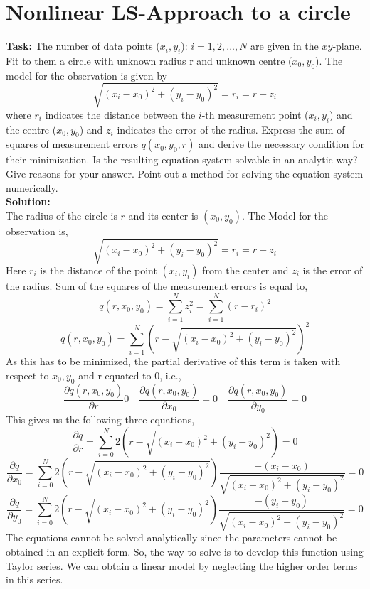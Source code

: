 \section{Nonlinear LS-Approach to a circle }
\noindent \textbf{Task:} The number of data points ($x_i,y_i$): $i = 1,2,...,N$ are given in the $xy$-plane. Fit to them a circle with unknown radius r and unknown centre ($x_0, y_0$). The model for the observation is given by
$$ \sqrt{(x_i - x_0)^2 + (y_i - y_0)^2} = r_i = r + z_i $$
\noindent where $r_i$ indicates the distance between the $i$-th measurement point ($x_i, y_i$) and the centre ($x_0, y_0$) and $z_i$ indicates the error of the radius. Express the sum of squares of measurement errors $q(x_0, y_0, r)$ and derive the necessary condition for their minimization. Is the resulting equation system solvable in an analytic way? Give reasons for your answer. Point out a method for solving the equation system numerically.
\\
\noindent \textbf{Solution:}\\
\noindent The radius of the circle is $r$ and its center is $(x_0,y_0)$. The Model for the observation is,
$$ \sqrt{(x_i - x_0)^2 + (y_i - y_0)^2} = r_i = r + z_i $$
\noindent Here $r_i$ is the distance of the point $(x_i,y_i)$ from the center and $z_i$ is the error of the radius. Sum of the squares of the measurement errors is equal to,
$$q(r,x_0,y_0) = \sum_{i=1}^Nz_i^2 = \sum_{i=1}^N(r-r_i)^2$$
$$q(r,x_0,y_0) = \sum_{i=1}^N(r-\sqrt{(x_i-x_0)^2+(y_i-y_0)^2})^2$$
\noindent As this has to be minimized, the partial derivative of this term is taken with respect to $x_0,y_0$ and r equated to 0, i.e.,
$$\frac{\partial q(r,x_0,y_0)}{\partial r} 0  \quad \frac{\partial q(r,x_0,y_0)}{\partial x_0} = 0 \quad \frac{\partial q(r,x_0,y_0)}{\partial y_0} = 0$$
\noindent This gives us the following three equations,
$$\frac{\partial q}{\partial r} = \sum_{i=0}^N2(r-\sqrt{(x_i-x_0)^2+(y_i-y_0)^2})=0$$
$$\frac{\partial q}{\partial x_0} = \sum_{i=0}^N2(r-\sqrt{(x_i-x_0)^2+(y_i-y_0)^2})\frac{-(x_i-x_0)}{\sqrt{(x_i-x_0)^2+(y_i-y_0)^2}}=0$$
$$\frac{\partial q}{\partial y_0} = \sum_{i=0}^N2(r-\sqrt{(x_i-x_0)^2+(y_i-y_0)^2})\frac{-(y_i-y_0)}{\sqrt{(x_i-x_0)^2+(y_i-y_0)^2}}=0$$
\noindent The equations cannot be solved analytically since the parameters cannot be obtained in an explicit form. So, the way to solve is to develop this function using Taylor series. We can obtain a linear model by neglecting the higher order terms in this series.

